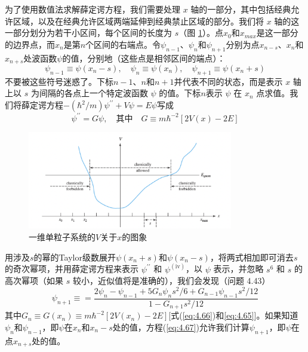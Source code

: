     为了使用数值法求解薛定谔方程，我们需要处理 $x$ 轴的一部分，其中包括经典允许区域，以及在经典允许区域两端延伸到经典禁止区域的部分。我们将 $x$ 轴的这一部分划分为若干小区间，每个区间的长度为 $s$（图 \ref{fig:4.7}）。点$x_0$和$x_{max}$是这一部分的边界点，而$x_n$是第$n$个区间的右端点。令$\psi_{n-1}$、$\psi_n$和$\psi_{n+1}$分别为点$x_{n-s}$、$x_n$和$x_{n+s}$处波函数$\psi$的值，分别地（这些点是相邻区间的端点）：
    \begin{equation}
        \psi_{n-1} \equiv \psi\left(x_n-s\right), \quad \psi_n \equiv \psi\left(x_n\right), \quad \psi_{n+1} \equiv \psi\left(x_n+s\right)
        \label{eq:4.65}
    \end{equation}
    不要被这些符号迷惑了。下标$n-1$、$n$和$n+1$并代表不同的状态，而是表示 $x$ 轴上以 $s$ 为间隔的各点上一个特定波函数 $\psi$ 的值。下标$n$表示 $\psi$ 在 $x_n$ 点求值。我们将薛定谔方程$-\left(\hbar^2/m\right)\psi^{\prime\prime} + V\psi = E\psi$写成
    \begin{equation}
        \psi^{\prime\prime} = G\psi, \quad \text{其中} \quad G \equiv m\hbar^{-2}\left[2V\left(x\right)-2E\right]
        \label{eq:4.66}
    \end{equation}
    \begin{figure}[ht]
        \centering
        \includegraphics[width=0.8\textwidth]{figures/4.7.png}
        \caption{一维单粒子系统的$V$关于$x$的图象}
        \label{fig:4.7}
    \end{figure}
    
    用涉及$s$的幂的Taylor级数展开$\psi\left(x_n+s\right)$和$\psi\left(x_n-s\right)$，将两式相加即可消去$s$的奇次幂项，并用薛定谔方程来表示 $\psi^{\prime\prime}$ 和 $\psi^{\left(\mathrm{iv}\right)}$，以 $\psi$ 表示，并忽略 $s^6$ 和 $s$ 的高次幂项（如果 $s$ 较小，近似值将是准确的），我们会发现（问题 4.43）
    \begin{equation}
        \psi_{n+1} \equiv = \frac{
            2\psi_n - \psi_{n-1} + 5G_n\psi_n s^2/6 + G_{n-1}\psi_{n-1}s^2/12
        }{
            1-G_{n+1}s^2/12
        }
        \label{eq:4.67}
    \end{equation}
    其中$G_n \equiv G\left(x_n\right) \equiv m\hbar^{-2}\left[2V\left(x_n\right)-2E\right]$[式(\ref{eq:4.66})和\ref{eq:4.65}]。如果知道$\psi_n$和$\psi_{n-1}$，即$\psi$在$x_n$和$x_n-s$处的值，方程(\ref{eq:4.67})允许我们计算$\psi_{n+1}$，即$\psi$在点$x_{n+s}$处的值。

